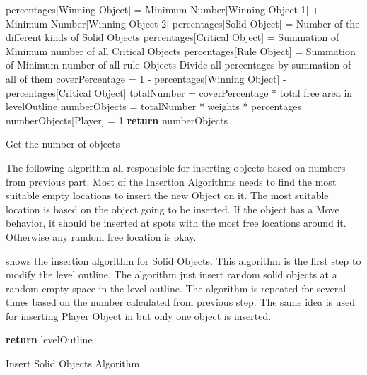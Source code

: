 \begin{algorithm}[H]
	\BlankLine
	percentages[Winning Object] = Minimum Number[Winning Object 1] + Minimum Number[Winning Object 2]\;
	percentages[Solid Object] = Number of the different kinds of Solid Objects\;
	percentages[Critical Object] = Summation of Minimum number of all Critical Objects\;
	percentages[Rule Object] = Summation of Minimum number of all rule Objects\;
	Divide all percentages by summation of all of them\;
	\BlankLine
	coverPercentage = 1 - percentages[Winning Object] - percentages[Critical Object]\;
	totalNumber = coverPercentage * total free area in levelOutline\;
	numberObjects = totalNumber * weights * percentages\;
	numberObjects[Player] = 1\;
	\BlankLine
	\textbf{return} numberObjects\;
	\caption{Get the number of objects}
	\label{Algorithm:numberObjects}
\end{algorithm}

The following algorithm all responsible for inserting objects based on numbers from previous part. Most of the Insertion Algorithms needs to find the most suitable empty locations to insert the new Object on it. The most suitable location is based on the object going to be inserted. If the object has a Move behavior, it should be inserted at spots with the most free locations around it. Otherwise any random free location is okay.\\\par

 shows the insertion algorithm for Solid Objects. This algorithm is the first step to modify the level outline. The algorithm just insert random solid objects at a random empty space in the level outline. The algorithm is repeated for several times based on the number calculated from previous step. The same idea is used for inserting Player Object in  but only one object is inserted.\\

\begin{algorithm}[H]
	\BlankLine
	\BlankLine
	\textbf{return} levelOutline\;
	\caption{Insert Solid Objects Algorithm}
	\label{Algorithm:solidObjects}
\end{algorithm}

